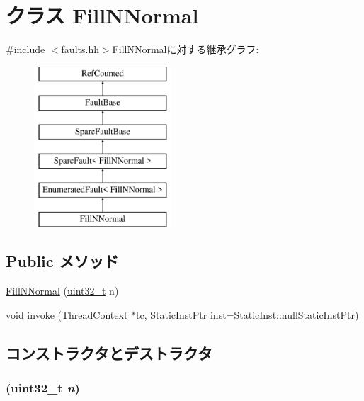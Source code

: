 \hypertarget{classSparcISA_1_1FillNNormal}{
\section{クラス FillNNormal}
\label{classSparcISA_1_1FillNNormal}
}


{\ttfamily \#include $<$faults.hh$>$}FillNNormalに対する継承グラフ:\begin{figure}[H]
\begin{center}
\leavevmode
\includegraphics[height=6cm]{classSparcISA_1_1FillNNormal}
\end{center}
\end{figure}
\subsection*{Public メソッド}
\begin{DoxyCompactItemize}
\item 
\hyperlink{classSparcISA_1_1FillNNormal_a0c6f6995889094ec8d75cb1cf7cfb1ef}{FillNNormal} (\hyperlink{Type_8hh_a435d1572bf3f880d55459d9805097f62}{uint32\_\-t} n)
\item 
void \hyperlink{classSparcISA_1_1FillNNormal_a2bd783b42262278d41157d428e1f8d6f}{invoke} (\hyperlink{classThreadContext}{ThreadContext} $\ast$tc, \hyperlink{classRefCountingPtr}{StaticInstPtr} inst=\hyperlink{classStaticInst_aa793d9793af735f09096369fb17567b6}{StaticInst::nullStaticInstPtr})
\end{DoxyCompactItemize}


\subsection{コンストラクタとデストラクタ}
\hypertarget{classSparcISA_1_1FillNNormal_a0c6f6995889094ec8d75cb1cf7cfb1ef}{
\subsubsection[{FillNNormal}]{ ({\bf uint32\_\-t} {\em n})}}
\label{classSparcISA_1_1FillNNormal_a0c6f6995889094ec8d75cb1cf7cfb1ef}



